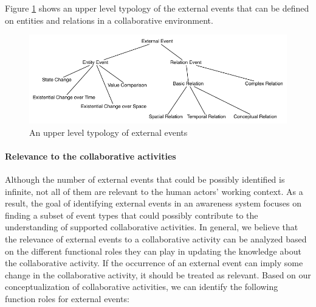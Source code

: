 Figure \ref{fig:external_events} shows an upper level typology of the external events that can be defined on entities and relations in a collaborative environment.
\begin{figure}[htbp] %
	\centering
	\includegraphics{external_events.pdf} 
	\caption{An upper level typology of external events}
	\label{fig:external_events}
\end{figure}

\paragraph*{Relevance to the collaborative activities} %
\label{par:relevance_to_the_field_of_work}
 Although the number of external events that could be possibly identified is infinite, not all of them are relevant to the human actors' working context. As a result, the goal of identifying external events in an awareness system focuses on finding a subset of event types that could possibly contribute to the understanding of supported collaborative activities. In general, we believe that the relevance of external events to a collaborative activity can be analyzed based on the different functional roles they can play in updating the knowledge about the collaborative activity. If the occurrence of an external event can imply some change in the collaborative activity, it should be treated as relevant. Based on our conceptualization of collaborative activities, we can identify the following function roles for external events:

